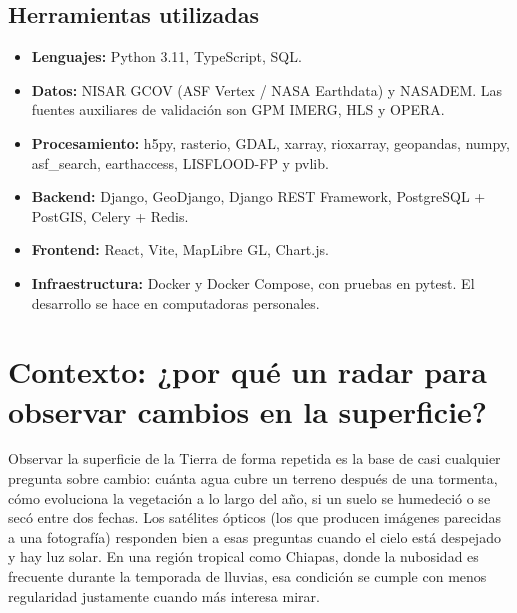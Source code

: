 \documentclass[11pt,a4paper]{article}
\begin{document}
\subsection{Herramientas utilizadas}

\begin{itemize}
  \item \textbf{Lenguajes:} Python 3.11, TypeScript, SQL.
  \item \textbf{Datos:} NISAR GCOV (ASF Vertex / NASA Earthdata) y NASADEM. Las fuentes auxiliares de
        validación son GPM IMERG, HLS y OPERA.
  \item \textbf{Procesamiento:} h5py, rasterio, GDAL, xarray, rioxarray, geopandas, numpy, asf\_search,
        earthaccess, LISFLOOD-FP y pvlib.
  \item \textbf{Backend:} Django, GeoDjango, Django REST Framework, PostgreSQL + PostGIS, Celery + Redis.
  \item \textbf{Frontend:} React, Vite, MapLibre GL, Chart.js.
  \item \textbf{Infraestructura:} Docker y Docker Compose, con pruebas en pytest. El desarrollo se hace en
        computadoras personales.
\end{itemize}

\section{Contexto: ¿por qué un radar para observar cambios en la superficie?}
\label{sec:contexto}

Observar la superficie de la Tierra de forma repetida es la base de casi cualquier pregunta sobre cambio:
cuánta agua cubre un terreno después de una tormenta, cómo evoluciona la vegetación a lo largo del año, si un
suelo se humedeció o se secó entre dos fechas. Los satélites ópticos (los que producen imágenes parecidas a
una fotografía) responden bien a esas preguntas cuando el cielo está despejado y hay luz solar. En una región
tropical como Chiapas, donde la nubosidad es frecuente durante la temporada de lluvias, esa condición se
cumple con menos regularidad justamente cuando más interesa mirar.
\end{document}
